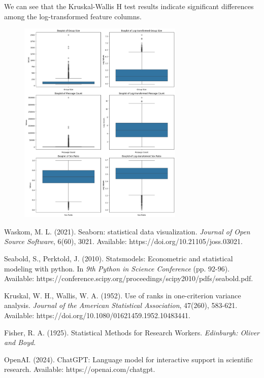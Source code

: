 \documentclass[12pt]{article}
\begin{document}
We can see that the Kruskal-Wallis H test results indicate significant differences among the log-transformed feature columns.
\newpage
\begin{figure}[h]
    \centering
    \includegraphics[width=0.7\textwidth]{image/output4.png}  
    \label{fig:Boxplot of Original and Log-transformed Data}
\end{figure}

\newpage
\begin{thebibliography}{99}

    Waskom, M. L. (2021). Seaborn: statistical data visualization. \emph{Journal of Open Source Software}, 6(60), 3021. Available: https://doi.org/10.21105/joss.03021.
    
    Seabold, S., Perktold, J. (2010). Statsmodels: Econometric and statistical modeling with python. In \emph{9th Python in Science Conference} (pp. 92-96). Available: https://conference.scipy.org/proceedings/scipy2010/pdfs/seabold.pdf.
    
    Kruskal, W. H., Wallis, W. A. (1952). Use of ranks in one-criterion variance analysis. \emph{Journal of the American Statistical Association}, 47(260), 583-621. Available: https://doi.org/10.1080/01621459.1952.10483441.
    
    Fisher, R. A. (1925). Statistical Methods for Research Workers. \emph{Edinburgh: Oliver and Boyd}.
    
    OpenAI. (2024). ChatGPT: Language model for interactive support in scientific research. Available: https://openai.com/chatgpt.
    
    \end{thebibliography}
    
    
\end{document}
